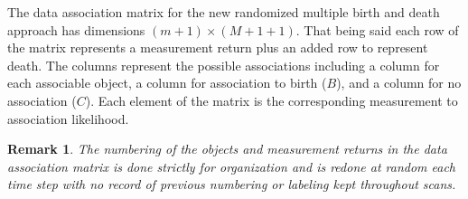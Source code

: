 \documentclass[10pt, conference]{IEEEtran}
\newtheorem{remark}{Remark}
\begin{document}
The data association matrix for the new randomized multiple birth and death approach has dimensions $(m+1)\times{(M+1+1)}$. That being said each row of the matrix represents a measurement return plus an added row to represent death. The columns represent the possible associations including a column for each associable object, a column for association to birth ($B$), and a column for no association ($C$). Each element of the matrix is the corresponding measurement to association likelihood.
\begin{remark}
The numbering of the objects and measurement returns in the data association matrix is done strictly for organization and is redone at random each time step with no record of previous numbering or labeling kept throughout scans. 
\end{remark}
\end{document}

